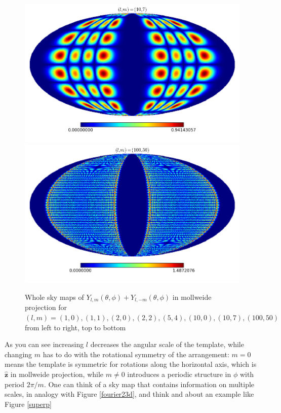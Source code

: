 \begin{figure}
\begin{center}
\includegraphics[scale=0.3]{Fourier/(10,7).png}
\includegraphics[scale=0.3]{Fourier/(100,50).png}
\end{center}
\caption{Whole sky maps of $Y_{l,m}(\theta,\phi)+Y_{l,-m}(\theta ,\phi)$ in mollweide projection for $(l,m)=(1,0),(1,1),(2,0),(2,2),(5,4),(10,0),(10,7),(100,50)$ 
from left to right, top to bottom}
\label{sphharmonics}
\end{figure}
As you can see increasing $l$ decreases the angular scale of the template, while changing $m$ has to do with the rotational symmetry of the arrangement: $m=0$ means the template is symmetric for rotations along the horizontal axis, which is $\mathbf{\hat{z}}$ in mollweide projection, while $m\neq 0$ introduces a periodic structure in $\phi$ with period $2\pi/m$. One can think of a sky map that contains information on multiple scales, in analogy with Figure \ref{fourier23d}, and think and about an example like Figure \ref{superp}
